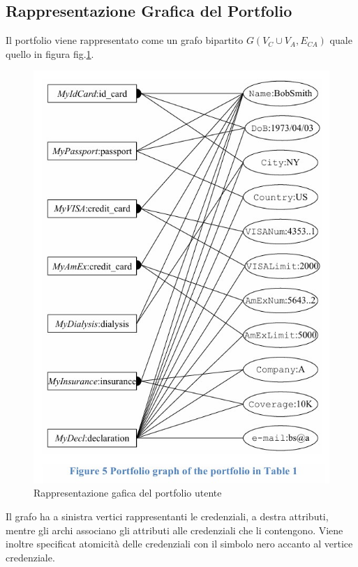 \subsection{Rappresentazione Grafica del Portfolio}
Il portfolio viene rappresentato come un grafo bipartito $G(V_C \cup V_A , E_{CA})$ quale quello in figura fig.\ref{fig:pref_graph_portfolio}.


\begin{figure}[ht]
    \centering
    \includegraphics[width=0.8\linewidth]{paper_user-privacy-preferences/00_pref_graph_portfolio.jpg}
    \caption{Rappresentazione gafica del portfolio utente}
    \label{fig:pref_graph_portfolio}
\end{figure}

Il grafo ha a sinistra vertici rappresentanti le credenziali, a destra attributi, mentre gli archi associano gli attributi alle credenziali che li contengono.
Viene inoltre specificat atomicità delle credenziali con il simbolo nero accanto al vertice credenziale.
